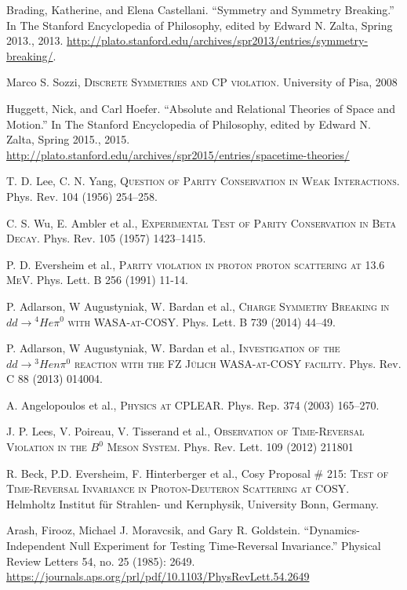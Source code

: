 \documentclass[14pt]{extarticle}
\newcommand{\SrcNm}[1]{\textsc{#1}}
\begin{document}
\begin{thebibliography}{9}

Brading, Katherine, and Elena Castellani. “Symmetry and Symmetry Breaking.” In The Stanford Encyclopedia of Philosophy, edited by Edward N. Zalta, Spring 2013., 2013. \url{http://plato.stanford.edu/archives/spr2013/entries/symmetry-breaking/}.


Marco S. Sozzi,
\SrcNm{Discrete Symmetries and CP violation}.
University of Pisa,
2008

Huggett, Nick, and Carl Hoefer. “Absolute and Relational Theories of Space and Motion.” In The Stanford Encyclopedia of Philosophy, edited by Edward N. Zalta, Spring 2015., 2015. \url{http://plato.stanford.edu/archives/spr2015/entries/spacetime-theories/}


T. D. Lee, C. N. Yang,
\SrcNm{Question of Parity Conservation in Weak Interactions}.
Phys. Rev. 104 (1956) 254--258.

C. S. Wu, E. Ambler et al.,
\SrcNm{Experimental Test of Parity Conservation in Beta Decay}.
Phys. Rev. 105 (1957) 1423--1415.

P. D. Eversheim et al.,
\SrcNm{Parity violation in proton proton scattering at 13.6 MeV}.
Phys. Lett. B 256 (1991) 11-14.

P. Adlarson, W Augustyniak, W. Bardan et al.,
\SrcNm{Charge Symmetry Breaking in $dd \to {}^4He \pi^0$ with WASA-at-COSY}.
Phys. Lett. B 739 (2014) 44–49.

P. Adlarson, W Augustyniak, W. Bardan et al.,
\SrcNm{Investigation of the $dd \to {}^3He n \pi^0$ reaction with the FZ J\"{u}lich WASA-at-COSY facility}.
Phys. Rev. C 88 (2013) 014004.

A. Angelopoulos et al.,
\SrcNm{Physics at CPLEAR}. 
Phys. Rep. 374 (2003) 165--270.

J. P. Lees, V. Poireau, V. Tisserand et al.,
\SrcNm{Observation of Time-Reversal Violation in the $B^0$ Meson System}.
Phys. Rev. Lett. 109 (2012) 211801

R. Beck, P.D. Eversheim, F. Hinterberger et al.,
Cosy Proposal \# 215:
\textsc{Test of Time-Reversal Invariance in Proton-Deuteron Scattering at 
COSY}.
Helmholtz Institut für Strahlen- und Kernphysik, University Bonn, Germany.

Arash, Firooz, Michael J. Moravcsik, and Gary R. Goldstein. “Dynamics-Independent Null Experiment for Testing Time-Reversal Invariance.” Physical Review Letters 54, no. 25 (1985): 2649.
\url{https://journals.aps.org/prl/pdf/10.1103/PhysRevLett.54.2649}


\end{thebibliography}
\end{document}
